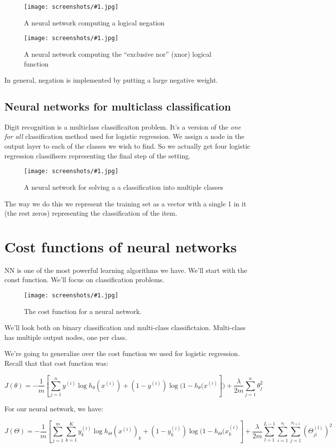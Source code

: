 \documentclass[a4, 12pt, english, USenglish]{scrreprt}
\newcommand{\screenshot}[2]{
\begin{figure}[htb]
\texttt{[image: screenshots/\#1.jpg]}
\label{#1}
\caption{#2}
\end{figure}}
\newcommand{\brackets}[1]{\ensuremath{\left[{#1}\right]}}
\newcommand{\idx}[1]{{\em #1}\index{#1}}
\begin{document}
\screenshot{negation}{A neural network computing a logical negation}

\screenshot{xnornet}{A neural network computing the ``exclusive nor''
  (xnor) logical function}

In general, negation is implemented by putting a large negative
weight.

\subsection{Neural networks for multiclass classification}

Digit recognition is a multiclass classificaiton problem. It's a
version of the \idx{one for all} classification method used for
logistic regression.    We assign a node in the output layer to each
of the classes we wish to find.  So we actually get four logistic
regression classifisers representing the final step of the setting.


\screenshot{neuralmulticlass}{A neural network for solving a a
  classification into multiple classes}

The way we do this we represent the training set  as a vector with a
single 1 in it (the rest zeros)  representing the classification of
the item.

\section{Cost functions of neural networks}

NN is one of the most powerful learning algorithms we have.  We'll
start with the const function.  We'll focus on classification
problems.

\screenshot{nncostfunction}{The cost function for a neural network.}

We'll look both on binary classification and multi-class
classifictaion.   Multi-class has multiple output nodes, one per class.

We're going to generalize over the cost function we used for logistic
regression.  Recall that that cost function was:

\[
J(\theta) = - \frac{1}{m} \brackets{\sum_{j=1}^n y^{(i)} 
          \log h_\theta(x^{(i)})     +
          (1 - y^{(i)})\log(1 - h_\theta(x^{(i)}})     
+ \frac{\lambda}{2  m}\sum_{j=1}^n \theta^2_j
\]


For our neural network, we have:

\[
J(\Theta) = - \frac{1}{m} \brackets{
     \sum_{j=1}^m \sum_{k=1}^K
        y_k^{(i)} 
          \log h_\Theta(x^{(i)})_k     +
          (1 - y_k^{(i)})\log(1 - h_\Theta(x^{(i)}_k}   
+ \frac{\lambda}{2  m}\sum_{l=1}^{L-1} \sum_{i=1}^{s_l} \sum_{j=1}^{s_{l+1}} (\Theta_{ji}^{(l)})^2
\]
\end{document}
